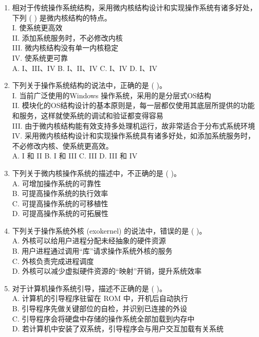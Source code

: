 \documentclass[lang=cn,newtx,10pt,scheme=chinese]{../../elegantbook}
\begin{document}
\begin{enumerate}
    \item 相对于传统操作系统结构，采用微内核结构设计和实现操作系统有诸多好处，下列 (    ) 是微内核结构的特点。\\
    I. 使系统更高效\\
    II. 添加系统服务时，不必修改内核\\
    III. 微内核结构没有单一内核稳定\\
    IV. 使系统更可靠\\
    A. I、III、IV \quad B. I、II、IV \quad C. I、IV \quad D. I、IV

    \item 下列关于操作系统结构的说法中，正确的是 (    )。\\
    I. 当前广泛使用的Windows 操作系统，采用的是分层式OS结构\\
    II. 模块化的OS结构设计的基本原则是，每一层都仅使用其底层所提供的功能和服务，这样就使系统的调试和验证都变得容易\\
    III. 由于微内核结构能有效支持多处理机运行，故非常适合于分布式系统环境\\
    IV. 采用微内核结构设计和实现操作系统具有诸多好处，如添加系统服务时，不必修改内核、使系统更高效。\\
    A. I 和 II \quad B. I 和 III \quad C. III \quad D. III 和 IV

    \item 下列关于微内核操作系统的描述中，不正确的是 (    )。\\
    A. 可增加操作系统的可靠性\\
    B. 可提高操作系统的执行效率\\
    C. 可提高操作系统的可移植性\\
    D. 可提高操作系统的可拓展性
    \item 下列关于操作系统外核 (exokernel) 的说法中，错误的是 (    )。\\
    A. 外核可以给用户进程分配未经抽象的硬件资源\\
    B. 用户进程通过调用“库”请求操作系统外核的服务\\
    C. 外核负责完成进程调度\\
    D. 外核可以减少虚拟硬件资源的“映射”开销，提升系统效率

    \item 对于计算机操作系统引导，描述不正确的是 (    )。\\
    A. 计算机的引导程序驻留在 ROM 中，开机后自动执行\\
    B. 引导程序先做关键部位的自检，并识别已连接的外设\\
    C. 引导程序会将硬盘中存储的操作系统全部加载到内存中\\
    D. 若计算机中安装了双系统，引导程序会与用户交互加载有关系统


\end{enumerate}
\end{document}
